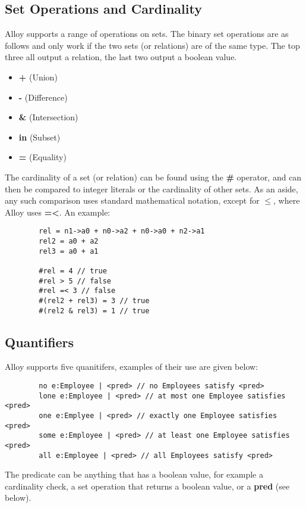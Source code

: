 \documentclass[10pt]{article}
\begin{document}
    \subsection*{Set Operations and Cardinality}
      Alloy supports a range of operations on sets. The binary set operations are as follows and only work if the two sets (or relations) are of the same type. The top three all output a relation, the last two output a boolean value.
      \begin{itemize}
        \item\textbf{+} (Union)
        \item\textbf{-} (Difference)
        \item\textbf{\&} (Intersection)
        \item\textbf{in} (Subset)
        \item\textbf{=} (Equality)
      \end{itemize}\par
      The cardinality of a set (or relation) can be found using the \textbf{\#} operator, and can then be compared to integer literals or the cardinality of other sets. As an aside, any such comparison uses standard mathematical notation, except for $\leq$, where Alloy uses \textbf{=\textless}. An example:
      \begin{lstlisting}
        rel = n1->a0 + n0->a2 + n0->a0 + n2->a1
        rel2 = a0 + a2
        rel3 = a0 + a1

        #rel = 4 // true
        #rel > 5 // false
        #rel =< 3 // false
        #(rel2 + rel3) = 3 // true
        #(rel2 & rel3) = 1 // true
      \end{lstlisting}\par
    \subsection*{Quantifiers}
      Alloy supports five quanitifers, examples of their use are given below:
      \begin{lstlisting}
        no e:Employee | <pred> // no Employees satisfy <pred>
        lone e:Employee | <pred> // at most one Employee satisfies <pred>
        one e:Emplyee | <pred> // exactly one Employee satisfies <pred>
        some e:Employee | <pred> // at least one Employee satisfies <pred>
        all e:Employee | <pred> // all Employees satisfy <pred>
      \end{lstlisting}
      The predicate can be anything that has a boolean value, for example a cardinality check, a set operation that returns a boolean value, or a \textbf{pred} (see below).
\end{document}
